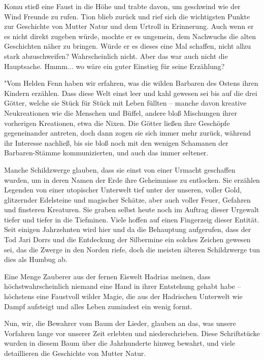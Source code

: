 \documentclass[10pt, a4paper, oneside]{book}
\begin{document}
Komu stieß eine Faust in die Höhe und trabte davon, um geschwind wie der Wind Freunde zu rufen. Tion blieb zurück und rief sich die wichtigsten Punkte zur Geschichte von Mutter Natur und dem Urtroll in Erinnerung. Auch wenn er es nicht direkt zugeben würde, mochte er es ungemein, dem Nachwuchs die alten Geschichten näher zu bringen. Würde er es dieses eine Mal schaffen, nicht allzu stark abzuschweifen? Wahrscheinlich nicht. Aber das war auch nicht die Hauptsache. Hmmm... wo wäre ein guter Einstieg für seine Erzählung?\bigskip

"Vom Helden Fenn haben wir erfahren, was die wilden Barbaren des Ostens ihren Kindern erzählen. Dass diese Welt einst leer und kahl gewesen sei bis auf die drei Götter, welche sie Stück für Stück mit Leben füllten – manche davon kreative Neukreationen wie die Menschen und Büffel, andere bloß Mischungen ihrer vorherigen Kreationen, etwa die Nixen. Die Götter ließen ihre Geschöpfe gegeneinander antreten, doch dann zogen sie sich immer mehr zurück, während ihr Interesse nachließ, bis sie bloß noch mit den wenigen Schamanen der Barbaren-Stämme kommunizierten, und auch das immer seltener.\bigskip

Manche Schildzwerge glauben, dass sie einst von einer Urmacht geschaffen wurden, um in deren Namen der Erde ihre Geheimnisse zu entlocken. Sie erzählen Legenden von einer utopischer Unterwelt tief unter der unseren, voller Gold, glitzernder Edelsteine und magischer Schätze, aber auch voller Feuer, Gefahren und finsteren Kreaturen. Sie graben selbst heute noch im Auftrag dieser Urgewalt tiefer und tiefer in die Tiefminen. Viele hoffen auf einen Fingerzeig dieser Entität. Seit einigen Jahrzehnten wird hier und da die Behauptung aufgerufen, dass der Tod Jari Dorrs und die Entdeckung der Silbermine ein solches Zeichen gewesen sei, das die Zwerge in den Norden riefe, doch die meisten älteren Schildzwerge tun dies als Humbug ab.\bigskip

Eine Menge Zauberer aus der fernen Eiswelt Hadrias meinen, dass höchstwahrscheinlich niemand eine Hand in ihrer Entstehung gehabt habe – höchstens eine Faustvoll wilder Magie, die aus der Hadrischen Unterwelt wie Dampf aufsteigt und alles Leben zumindest ein wenig formt.\bigskip

Nun, wir, die Bewahrer vom Baum der Lieder, glauben an das, was unsere Vorfahren lange vor unserer Zeit erlebten und niederschrieben. Diese Schriftstücke wurden in diesem Baum über die Jahrhunderte hinweg bewahrt, und viele detaillieren die Geschichte von Mutter Natur.
\end{document}
